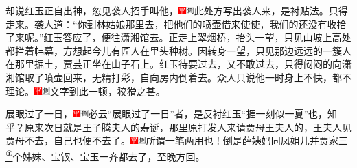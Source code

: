 却说红玉正自出神，忽见袭人招手叫他，{\includegraphics[width=3mm]{../Images/00002}\includegraphics[width=3mm]{../Images/00011}\footnotesize \kaishu 此处方写出袭人来，是衬贴法。}只得走来。袭人道：``你到林姑娘那里去，把他们的喷壶借来使使，我们的还没有收拾了来呢。''红玉答应了，便往潇湘馆去。正走上翠烟桥，抬头一望，只见山坡上高处都拦着帏幕，方想起今儿有匠人在里头种树。因转身一望，只见那边远远的一簇人在那里掘土，贾芸正坐在山子石上。红玉待要过去，又不敢过去，只得闷闷的向潇湘馆取了喷壶回来，无精打彩，自向房内倒着去。众人只说他一时身上不快，都不理论。{\includegraphics[width=3mm]{../Images/00002}\includegraphics[width=3mm]{../Images/00011}\footnotesize \kaishu 文字到此一顿，狡猾之甚。}

展眼过了一日，{\includegraphics[width=3mm]{../Images/00002}\includegraphics[width=3mm]{../Images/00011}\footnotesize \kaishu 必云``展眼过了一日''者，是反衬红玉``捱一刻似一夏''也，知乎？}原来次日就是王子腾夫人的寿诞，那里原打发人来请贾母王夫人的，王夫人见贾母不去，自己也便不去了。{\includegraphics[width=3mm]{../Images/00002}\includegraphics[width=3mm]{../Images/00011}\footnotesize \kaishu 所谓一笔两用也！}倒是薛姨妈同凤姐儿并贾家三\href{../Text/part0029_split_000.html\#lnkback_1_a}{\textsuperscript{①}}个姊妹、宝钗、宝玉一齐都去了，至晚方回。

